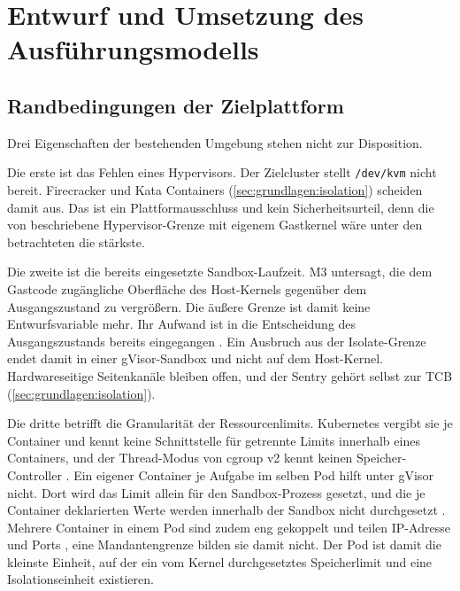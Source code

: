 \clearpage
\section{Entwurf und Umsetzung des Ausführungsmodells} \label{sec:Entwurf}

\subsection{Randbedingungen der Zielplattform}
\label{sec:randbedingungen}

Drei Eigenschaften der bestehenden Umgebung stehen nicht zur Disposition.

Die erste ist das Fehlen eines Hypervisors. Der Zielcluster stellt \texttt{/dev/kvm} nicht bereit. Firecracker und
Kata Containers (\autoref{sec:grundlagen:isolation}) scheiden damit aus. Das ist ein Plattformausschluss und kein
Sicherheitsurteil, denn die von \textcite[S.~420, 424]{agache_firecracker_2020} beschriebene Hypervisor-Grenze mit eigenem Gastkernel wäre unter den betrachteten die stärkste.

Die zweite ist die bereits eingesetzte Sandbox-Laufzeit. M3 untersagt, die dem Gastcode zugängliche Oberfläche des
Host-Kernels gegenüber dem Ausgangszustand zu vergrößern. Die äußere Grenze ist damit keine Entwurfsvariable mehr. Ihr
Aufwand ist in die Entscheidung des Ausgangszustands bereits eingegangen \autocites[S.~3]{young_true_2019}[S.~1497]{wang_performance_2022}. Ein
Ausbruch aus der Isolate-Grenze endet damit in einer gVisor-Sandbox und nicht auf dem Host-Kernel. Hardwareseitige
Seitenkanäle bleiben offen, und der Sentry gehört selbst zur \ac{TCB} (\autoref{sec:grundlagen:isolation}).

Die dritte betrifft die Granularität der Ressourcenlimits. Kubernetes vergibt sie je Container
\autocite{the_kubernetes_authors_resource_2026} und kennt keine Schnittstelle für getrennte Limits innerhalb eines
Containers, und der Thread-Modus von cgroup v2 kennt keinen Speicher-Controller
\autocite{the_kernel_development_community_control_2026}. Ein eigener Container je Aufgabe im selben Pod hilft unter
gVisor nicht. Dort wird das Limit allein für den Sandbox-Prozess gesetzt, und die je Container deklarierten Werte
werden innerhalb der Sandbox nicht durchgesetzt \autocite{googlegvisor_contributors_container_2019}. Mehrere Container in einem Pod sind zudem eng gekoppelt und teilen IP-Adresse und Ports \autocite{the_kubernetes_authors_pods_2026}, eine Mandantengrenze bilden sie damit nicht. Der Pod ist damit die kleinste Einheit, auf der ein vom Kernel
durchgesetztes Speicherlimit und eine Isolationseinheit existieren.

